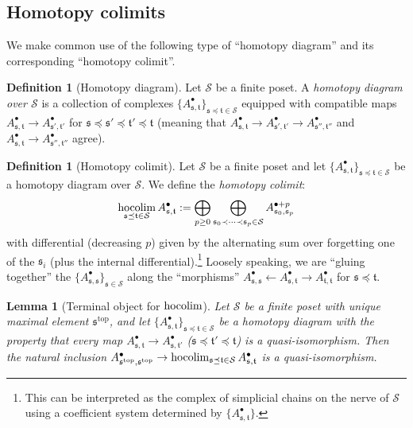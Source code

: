 \documentclass[12pt]{article}
\newtheorem{lemma}[theorem]{Lemma}
\theoremstyle{definition}
\newtheorem{definition}[theorem]{Definition}
\theoremstyle{remark}
\numberwithin{equation}{subsection}
\newcommand{\s}{\mathfrak s}
\newcommand{\ttt}{\mathfrak t}
\newcommand{\SSS}{\mathcal S}
\newcommand{\ttop}{\mathrm{top}}
\newcommand{\hocolim}{\operatornamewithlimits{hocolim}}
\begin{document}
\subsection{Homotopy colimits}\label{hocolimintro}

We make common use of the following type of ``homotopy diagram'' and its corresponding ``homotopy colimit''.  

\begin{definition}[Homotopy diagram]
Let $\SSS$ be a finite poset.  A \emph{homotopy diagram over $\SSS$} is a collection of complexes $\{A^\bullet_{\s,\ttt}\}_{\s\preceq\ttt\in\SSS}$ equipped with compatible maps $A^\bullet_{\s,\ttt}\to A^\bullet_{\s',\ttt'}$ for $\s\preceq\s'\preceq\ttt'\preceq\ttt$ (meaning that $A^\bullet_{\s,\ttt}\to A^\bullet_{\s',\ttt'}\to A^\bullet_{\s'',\ttt''}$ and $A^\bullet_{\s,\ttt}\to A^\bullet_{\s'',\ttt''}$ agree).
\end{definition}

\begin{definition}[Homotopy colimit]\label{homotopycolimit}
Let $\SSS$ be a finite poset and let $\{A^\bullet_{\s,\ttt}\}_{\s\preceq\ttt\in\SSS}$ be a homotopy diagram over $\SSS$.  We define the \emph{homotopy colimit}:
\begin{equation}
\hocolim_{\s\preceq\ttt\in\SSS}A^\bullet_{\s,\ttt}:=\bigoplus_{p\geq 0}\bigoplus_{\s_0\prec\cdots\prec\s_p\in\SSS}A^{\bullet+p}_{\s_0,\s_p}
\end{equation}
with differential (decreasing $p$) given by the alternating sum over forgetting one of the $\s_i$ (plus the internal differential).\footnote{This can be interpreted as the complex of simplicial chains on the nerve of $\SSS$ using a coefficient system determined by $\{A^\bullet_{\s,\ttt}\}$.}  Loosely speaking, we are ``gluing together'' the $\{A^\bullet_{\s,\s}\}_{\s\in\SSS}$ along the ``morphisms'' $A^\bullet_{\s,\s}\leftarrow A^\bullet_{\s,\ttt}\to A^\bullet_{\ttt,\ttt}$ for $\s\preceq\ttt$.
\end{definition}

\begin{lemma}[Terminal object for $\hocolim$]\label{comboretraction}
Let $\SSS$ be a finite poset with unique maximal element $\s^\ttop$, and let $\{A^\bullet_{\s,\ttt}\}_{\s\preceq\ttt\in\SSS}$ be a homotopy diagram with the property that every map $A^\bullet_{\s,\ttt}\to A^\bullet_{\s,\ttt'}$ ($\s\preceq\ttt'\preceq\ttt$) is a quasi-isomorphism.  Then the natural inclusion $A^\bullet_{\s^\ttop,\s^\ttop}\to\hocolim_{\s\preceq\ttt\in\SSS}A^\bullet_{\s,\ttt}$ is a quasi-isomorphism.
\end{lemma}
\end{document}
